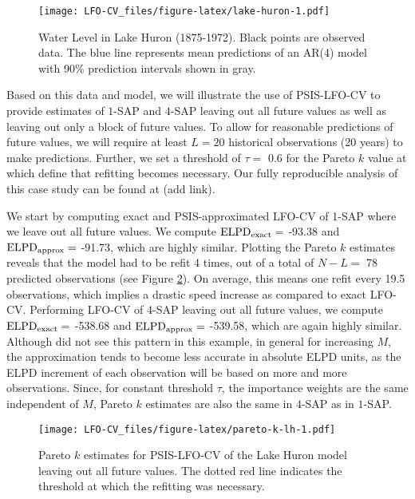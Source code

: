 \documentclass[american,]{article}
\begin{document}
\begin{figure}
\centering
\texttt{[image: LFO-CV\_files/figure-latex/lake-huron-1.pdf]}
\caption{\label{fig:lake-huron}Water Level in Lake Huron (1875-1972). Black points are observed data. The blue line represents mean predictions of an AR(4) model with 90\% prediction intervals shown in gray.}
\end{figure}

Based on this data and model, we will illustrate the use of PSIS-LFO-CV to
provide estimates of \(1\)-SAP and \(4\)-SAP leaving out all future values as well
as leaving out only a block of future values. To allow for reasonable
predictions of future values, we will require at least \(L = 20\) historical
observations (20 years) to make predictions. Further, we set a threshold of
\(\tau =\) 0.6 for the Pareto \(k\) value at which define that refitting
becomes necessary. Our fully reproducible analysis of this case study can be
found at (add link).

We start by computing exact and PSIS-approximated LFO-CV of 1-SAP where we
leave out all future values. We compute
\({\rm ELPD}_{\rm exact} =\) -93.38 and
\({\rm ELPD}_{\rm approx} =\) -91.73,
which are highly similar. Plotting the Pareto \(k\) estimates reveals that the
model had to be refit 4 times, out of a total of \(N - L =\)
78 predicted observations (see Figure \ref{fig:pareto-k-lh}). On average,
this means one refit every 19.5 observations, which
implies a drastic speed increase as compared to exact LFO-CV.
Performing LFO-CV of 4-SAP leaving out all future values, we compute
\({\rm ELPD}_{\rm exact} =\) -538.68 and
\({\rm ELPD}_{\rm approx} =\) -539.58,
which are again highly similar. Although did not see this pattern in this
example, in general for increasing \(M\), the approximation tends to become less
accurate in absolute ELPD units, as the ELPD increment of each observation will
be based on more and more observations. Since, for constant threshold \(\tau\),
the importance weights are the same independent of \(M\), Pareto \(k\) estimates are
also the same in \(4\)-SAP as in \(1\)-SAP.

\begin{figure}
\centering
\texttt{[image: LFO-CV\_files/figure-latex/pareto-k-lh-1.pdf]}
\caption{\label{fig:pareto-k-lh}Pareto \(k\) estimates for PSIS-LFO-CV of the Lake Huron model leaving out all future values. The dotted red line indicates the threshold at which the refitting was necessary.}
\end{figure}
\end{document}

